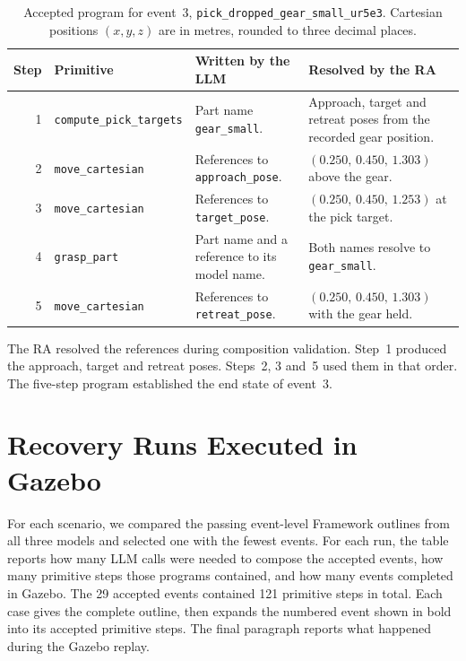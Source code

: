 \documentclass[preprint,12pt,authoryear]{elsarticle}
\let\code\nolinkurl
\begin{document}
\begin{table}[H]
\centering\small
\caption{Accepted program for event~3, \code{pick_dropped_gear_small_ur5e3}. Cartesian positions $(x,y,z)$ are in metres, rounded to three decimal places.}\label{tab:pick}
\begin{tabularx}{\linewidth}{@{}r l Y Y@{}}
\toprule
Step & Primitive & Written by the LLM & Resolved by the RA \\
 & \code{compute_pick_targets} & Part name \code{gear_small}. & Approach, target and retreat poses from the recorded gear position. \\
2 & \code{move_cartesian} & References to \code{approach_pose}. & $(0.250,\,0.450,\,1.303)$ above the gear. \\
3 & \code{move_cartesian} & References to \code{target_pose}. & $(0.250,\,0.450,\,1.253)$ at the pick target. \\
4 & \code{grasp_part} & Part name and a reference to its model name. & Both names resolve to \code{gear_small}. \\
5 & \code{move_cartesian} & References to \code{retreat_pose}. & $(0.250,\,0.450,\,1.303)$ with the gear held. \\
\bottomrule
\end{tabularx}
\end{table}

The RA resolved the references during composition validation. Step~1 produced
the approach, target and retreat poses. Steps~2, 3 and~5 used them in that
order. The five-step program established the end state of event~3.

\clearpage
\section{Recovery Runs Executed in Gazebo}\label{sec:gazebo}
\setcounter{table}{0}
\renewcommand*{\theHtable}{C.\arabic{table}}

For each scenario, we compared the passing event-level Framework outlines from
all three models and selected one with the fewest events.
For each run, the table reports how many LLM calls were needed to compose
the accepted events, how many primitive steps those programs contained, and
how many events completed in Gazebo. The 29 accepted events contained 121
primitive steps in total. Each case gives the complete outline, then expands the numbered event shown in bold into its accepted primitive steps. The final paragraph reports what happened during the Gazebo replay.
\end{document}
